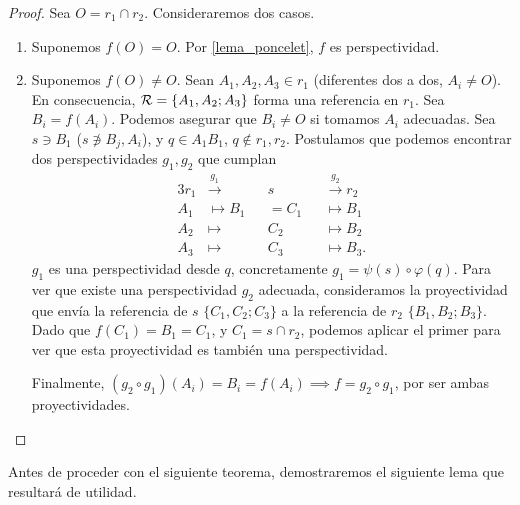 \begin{proof} %
    Sea $O = r_1 \cap r_2$. Consideraremos dos casos. 
    \begin{enumerate}
        \item Suponemos $f(O) = O$. Por \ref{lema_poncelet}, 
        $f$ es perspectividad.
        \item Suponemos $f(O) \neq O$. Sean $A_1, A_2, A_3 \in r_1$
        (diferentes dos a dos, $A_i \neq O$). En consecuencia,
        $\mathcal{R} = \{A_1, A_2; A_3\}$ forma una referencia en $r_1$.
        Sea $B_i = f(A_i)$. Podemos asegurar que $B_i \neq O$
        si tomamos $A_i$ adecuadas. Sea $s \ni B_1$ ($ s 
        \not \ni B_j, A_i$), y $q \in A_1B_1$, $q \not
        \in r_1, r_2$. Postulamos que podemos encontrar
        dos perspectividades $g_1, g_2$ que cumplan
        \begin{alignat*}{3}
            r_1 &\stackrel{g_1}\longrightarrow &&s&&
            \stackrel{g_2}\longrightarrow r_2\\
            A_1 &\longmapsto B_1&&=C_1 &&\longmapsto B_1\\
            A_2 &\longmapsto &&C_2&&\longmapsto B_2\\
            A_3 &\longmapsto &&C_3&&\longmapsto B_3.
        \end{alignat*}
        $g_1$ es una perspectividad desde $q$, concretamente
        $g_1 = \psi(s) \circ \varphi(q)$. Para ver que existe
        una perspectividad $g_2$ adecuada, consideramos la
        proyectividad que envía la referencia de $s$
        $\{C_1, C_2; C_3\}$ a la referencia de $r_2$ $\{B_1,
        B_2; B_3\}$. Dado que $f(C_1) = B_1 = C_1$, y $C_1 = 
        s \cap r_2$, podemos aplicar el primer para ver que 
        esta proyectividad es también una perspectividad.
        
        Finalmente, $(g_2 \circ g_1)(A_i) = B_i = f(A_i) \implies
        f = g_2 \circ g_1$, por ser ambas proyectividades.
    \end{enumerate}
\end{proof}

Antes de proceder con el siguiente teorema, demostraremos
el siguiente lema que resultará de utilidad.

